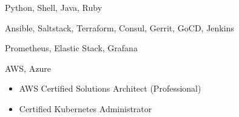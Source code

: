 \documentclass{resume}
\begin{document}
\smallskip


\begin{body}
\begin{description}[style=nextline,leftmargin=8em,topsep=1pt]
	\item[语言] Python, Shell, Java, Ruby
	\item[工具] Ansible, Saltstack, Terraform, Consul, Gerrit, GoCD, Jenkins
	\item[监控] Prometheus, Elastic Stack, Grafana
	\item[云服务] AWS, Azure
\end{description}
\end{body}





%




\begin{body}
	\begin{itemize}[noitemsep,topsep=0pt]
		\item AWS Certified Solutions Architect (Professional)
		\item Certified Kubernetes Administrator
	\end{itemize}
\end{body}


\end{document}
